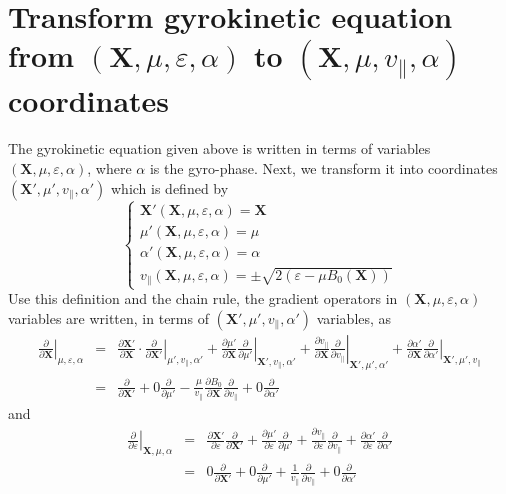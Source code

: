 \documentclass{article}
\begin{document}
\section{Transform gyrokinetic equation from $(\mathbf{X}, \mu, \varepsilon,
\alpha)$ to $(\mathbf{X}, \mu, v_{\parallel}, \alpha)$ coordinates}

The gyrokinetic equation given above is written in terms of variables
$(\mathbf{X}, \mu, \varepsilon, \alpha)$, where $\alpha$ is the gyro-phase.
Next, we transform it into coordinates $(\mathbf{X}', \mu', v_{\parallel},
\alpha')$ which is defined by
\begin{equation}
  \left\{ \begin{array}{l}
    \mathbf{X}' (\mathbf{X}, \mu, \varepsilon, \alpha) =\mathbf{X}\\
    \mu' (\mathbf{X}, \mu, \varepsilon, \alpha) = \mu\\
    \alpha' (\mathbf{X}, \mu, \varepsilon, \alpha) = \alpha\\
    v_{\parallel} (\mathbf{X}, \mu, \varepsilon, \alpha) = \pm \sqrt{2
    (\varepsilon - \mu B_0 (\mathbf{X}))}
  \end{array} \right.
\end{equation}
Use this definition and the chain rule, the gradient operators in
$(\mathbf{X}, \mu, \varepsilon, \alpha)$ variables are written, in terms of
$(\mathbf{X}', \mu', v_{\parallel}, \alpha')$ variables, as
\begin{eqnarray}
  \left. \frac{\partial}{\partial \mathbf{X}} \right|_{\mu, \varepsilon,
  \alpha} & = & \frac{\partial \mathbf{X}'}{\partial \mathbf{X}} \cdot \left.
  \frac{\partial}{\partial \mathbf{X}'} \right|_{\mu', v_{\parallel}, \alpha'}
  + \frac{\partial \mu'}{\partial \mathbf{X}}  \left. \frac{\partial}{\partial
  \mu'} \right|_{\mathbf{X}', v_{\parallel}, \alpha'} + \frac{\partial
  v_{\parallel}}{\partial \mathbf{X}}  \left. \frac{\partial}{\partial
  v_{\parallel}} \right|_{\mathbf{X}', \mu', \alpha'} + \frac{\partial \alpha'
  }{\partial \mathbf{X}}  \left. \frac{\partial}{\partial \alpha'}
  \right|_{\mathbf{X}', \mu', v_{\parallel}} \nonumber\\
  & = & \frac{\partial}{\partial \mathbf{X}'} + 0 \frac{\partial}{\partial
  \mu'} - \frac{\mu}{v_{\parallel}}  \frac{\partial B_0}{\partial \mathbf{X}} 
  \frac{\partial}{\partial v_{\parallel}} + 0 \frac{\partial}{\partial
  \alpha'}  \label{19-1-2-e1}
\end{eqnarray}
and
\begin{eqnarray}
  \left. \frac{\partial}{\partial \varepsilon} \right|_{\mathbf{X}, \mu,
  \alpha} & = & \frac{\partial \mathbf{X}'}{\partial \varepsilon}
  \frac{\partial}{\partial \mathbf{X}'} + \frac{\partial \mu'}{\partial
  \varepsilon} \frac{\partial}{\partial \mu'} + \frac{\partial
  v_{\parallel}}{\partial \varepsilon} \frac{\partial}{\partial v_{\parallel}}
  + \frac{\partial \alpha'}{\partial \varepsilon} \frac{\partial}{\partial
  \alpha'} \nonumber\\
  & = & 0 \frac{\partial}{\partial \mathbf{X}'} + 0 \frac{\partial}{\partial
  \mu'} + \frac{1}{v_{\parallel}}  \frac{\partial}{\partial v_{\parallel}} + 0
  \frac{\partial}{\partial \alpha'} 
\end{eqnarray}
\end{document}
